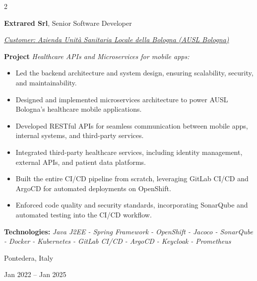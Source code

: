\documentclass[10pt, a4paper]{article}
\newenvironment{highlights}{
    \begin{itemize}[
        topsep=0.10 cm,
        parsep=0.10 cm,
        partopsep=0pt,
        itemsep=0pt,
        leftmargin=0.4 cm + 10pt
    ]
}{
    \end{itemize}
} %
\newenvironment{twocolentry}[2][]{
    \onecolentry
    \def\secondColumn{#2}
    \setcolumnwidth{\fill, 4.5 cm}
    \begin{paracol}{2}
}{
    \switchcolumn \raggedleft \secondColumn
    \end{paracol}
    \endonecolentry
} %
\begin{document}
        \vspace{0.2 cm}

        \begin{twocolentry}{
            \fontsize{14}{18}Pontedera, Italy

        Jan 2022 – Jan 2025
            \normalsize
        }
            \fontsize{12}{16}
            \textcolor{secondaryColor}{\faBriefcase\hspace{4pt}\textbf{Extrared Srl},} Senior Software Developer
            \normalsize

            \vspace{0.10 cm}
                \vspace{0.10 cm}

                \textcolor{tertiaryColor}{\faAngleDoubleRight\hspace{0.1cm}\underline{\textit{Customer:} \textit{Azienda Unità Sanitaria Locale della Bologna (AUSL Bologna)}}}

                \vspace{0.2cm}
                \textbf{Project \faAngleRight} \textit{Healthcare APIs and Microservices for mobile apps:}

                \begin{highlights}
                        \item Led the backend architecture and system design, ensuring scalability, security, and maintainability.
                        \item Designed and implemented microservices architecture to power AUSL Bologna's healthcare mobile applications.
                        \item Developed RESTful APIs for seamless communication between mobile apps, internal systems, and third-party services.
                        \item Integrated third-party healthcare services, including identity management, external APIs, and patient data platforms.
                        \item Built the entire CI/CD pipeline from scratch, leveraging GitLab CI/CD and ArgoCD for automated deployments on OpenShift.
                        \item Enforced code quality and security standards, incorporating SonarQube and automated testing into the CI/CD workflow.
                \end{highlights}
                \faBuffer
                \textbf{ Technologies:} \textit{Java J2EE - Spring Framework - OpenShift - Jacoco - SonarQube - Docker - Kubernetes - GitLab CI/CD - ArgoCD - Keycloak - Prometheus}


\end{twocolentry}
\end{document}

